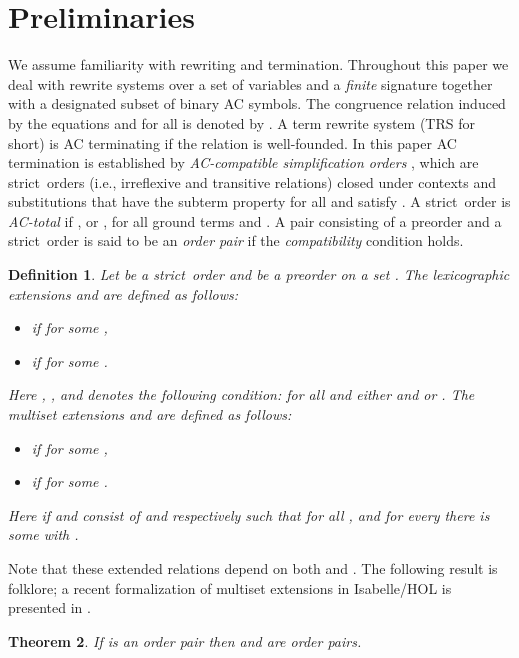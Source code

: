 \documentclass{tlp}
\newcommand{\qed}{\hspace*{1em}\hbox{\proofbox}}
\newtheorem{theorem}{Theorem}[section]
\newtheorem{definition}[theorem]{Definition}
\newcommand{\proper}{proper}
\renewcommand{\proper}{strict}
\begin{document}
\section{Preliminaries}

We assume familiarity with rewriting and termination. Throughout this
paper we deal with rewrite systems over
a set  of variables and a \emph{finite} signature 
together with a designated subset  of binary AC symbols. The
congruence relation induced by the equations  and
 for all  is denoted by
. A term rewrite system (TRS for short)  is AC terminating if
the relation  is well-founded. In
this paper AC termination is established by
\emph{AC-compatible simplification orders} , which are
\proper\ orders (i.e., irreflexive and transitive relations)
closed under contexts and substitutions that have the subterm property
 for all  and satisfy
.
A \proper\ order  is \emph{AC-total} if
,  or , for all ground terms  and .
A pair  consisting of a preorder  and a \proper\
order  is said to be an \emph{order pair} if the \emph{compatibility}
condition  holds.


\begin{definition}
\label{lex and mul}
Let  be a \proper\ order and  be a preorder on a set .
The \emph{lexicographic extensions}  and 
are defined as follows:
\begin{itemize}
\item
 if 
for some ,
\item
\smallskip
 if 
for some .
\end{itemize}
Here , , and
 denotes the following condition:
 for all  and either 
 and  or .
The \emph{multiset extensions}  and  are
defined as follows:
\begin{itemize}
\item
 if  for some
,
\item
\smallskip
 if  for some
.
\end{itemize}
Here  if  and  consist of  
and  respectively such that  for all 
, and for every  there is some
 with .
\end{definition}

Note that these extended relations depend on both  and .
The following result is folklore;
a recent formalization of multiset
extensions in Isabelle/HOL is presented in \cite{TAN12}.

\begin{theorem}
\label{thm:order pair}
If  is an order pair then 
and  are order pairs.
\qed
\end{theorem}
\end{document}
